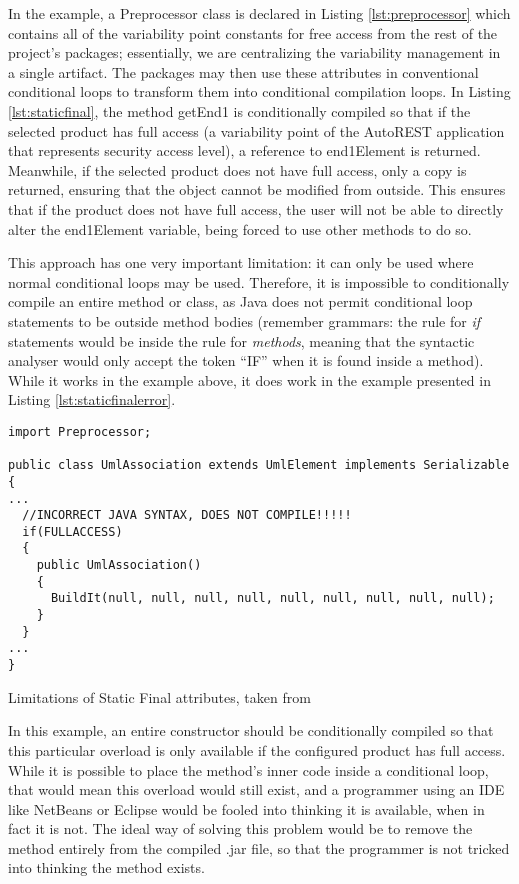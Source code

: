 In the example, a Preprocessor class is declared in Listing \ref{lst:preprocessor} which contains all of the variability point constants for free access from the rest of the project's packages; essentially, we are centralizing the variability management in a single artifact. The packages may then use these attributes in conventional conditional loops to transform them into conditional compilation loops. In Listing \ref{lst:staticfinal}, the method getEnd1 is conditionally compiled so that if the selected product has full access (a \gls{variability} point of the AutoREST application \cite{AUTOREST} that represents security access level), a reference to end1Element is returned. Meanwhile, if the selected product does not have full access, only a copy is returned, ensuring that the object cannot be modified from outside. This ensures that if the product does not have full access, the user will not be able to directly alter the end1Element variable, being forced to use other methods to do so.

This approach has one very important limitation: it can only be used where normal conditional loops may be used. Therefore, it is impossible to conditionally compile an entire method or class, as Java does not permit conditional loop statements to be outside method bodies (remember \gls{grammar}s: the rule for \emph{if} statements would be inside the rule for \emph{methods}, meaning that the syntactic analyser would only accept the token ``IF'' when it is found inside a method). While it works in the example above, it does work in the example presented in Listing \ref{lst:staticfinalerror}.

\begin{listing}
\begin{verbatim}
import Preprocessor;

public class UmlAssociation extends UmlElement implements Serializable
{
...
  //INCORRECT JAVA SYNTAX, DOES NOT COMPILE!!!!!
  if(FULLACCESS)
  {
    public UmlAssociation()
    {
      BuildIt(null, null, null, null, null, null, null, null, null);
    }
  }
...
}
\end{verbatim}
\caption{Limitations of Static Final attributes, taken from \cite{AUTOREST}} \label{lst:staticfinalerror}
\end{listing}

In this example, an entire constructor should be conditionally compiled so that this particular overload is only available if the configured product has full access. While it is possible to place the method's inner code inside a conditional loop, that would mean this overload would still exist, and a programmer using an IDE like NetBeans or Eclipse would be fooled into thinking it is available, when in fact it is not. The ideal way of solving this problem would be to remove the method entirely from the compiled .jar file, so that the programmer is not tricked into thinking the method exists.

